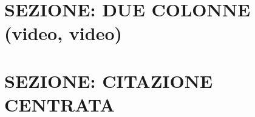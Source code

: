\documentclass[aspectratio=1610]{beamer}
\begin{document}
\section{SEZIONE: DUE COLONNE (video, video)}


\section{SEZIONE: CITAZIONE CENTRATA}

\end{document}
